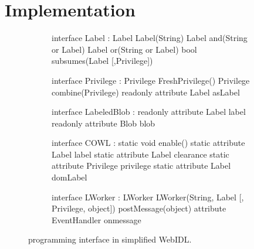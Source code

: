 \section{Implementation}
\label{sec:implementation}

\begin{figure}[t]
  \begin{subfigure}{\columnwidth}
    {\small
    \begin{webidl}
interface Label :
  Label Label(String)
  Label and(String or Label)
  Label or(String or Label)
  bool subsumes(Label [,Privilege])
    \end{webidl}
    \begin{webidl}
interface Privilege :
  Privilege FreshPrivilege()
  Privilege combine(Privilege)
  readonly attribute Label asLabel
    \end{webidl}
    }
    \vspace*{-8pt}
    \label{fig:api:policy} 
    \vspace*{8pt}
  \end{subfigure}
  \begin{subfigure}{\columnwidth}
    {\small
    \begin{webidl}
interface LabeledBlob :
  readonly attribute Label label
  readonly attribute Blob blob
    \end{webidl}
    }
    \vspace*{-8pt}
    \label{fig:api:blob} 
    \vspace*{8pt}
  \end{subfigure}
  \begin{subfigure}{\columnwidth}
    {\small
    \begin{webidl}
interface COWL :
  static void enable()
  static attribute Label label
  static attribute Label clearance 
  static attribute Privilege privilege
  static attribute Label domLabel
    \end{webidl}
    \begin{webidl}
interface LWorker :
  LWorker LWorker(String, Label
                  [, Privilege, object])
  postMessage(object)
  attribute EventHandler onmessage
    \end{webidl}
    }
    \vspace*{-8pt}
    \label{fig:api:compartments}
  \end{subfigure}
  \caption{\sys{} programming interface in simplified WebIDL.}
  \label{fig:api}
\end{figure}

